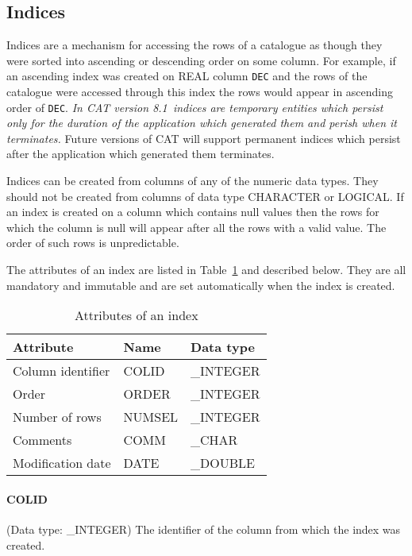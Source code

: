 \documentclass[11pt,twoside]{starlink}
\providecommand{\CATversion}{8.1~}
\begin{document}
\subsection{Indices}

Indices are a mechanism for accessing the rows of a catalogue as though
they were sorted into ascending or descending order on some column.  For
example, if an ascending index was created on REAL column \texttt{DEC} and
the rows of the catalogue were accessed through this index the rows
would appear in ascending order of \texttt{DEC}. \textit{In CAT version
\CATversion indices are temporary entities which persist only for the
duration of the application which generated them and perish when it
terminates.} Future versions of CAT will support permanent indices which
persist after the application which generated them terminates.

Indices can be created from columns of any of the numeric data types.
They should not be created from columns of data type CHARACTER or
LOGICAL. If an index is created on a column which contains null values
then the rows for which the column is null will appear after all the
rows with a valid value. The order of such rows is unpredictable.

The attributes of an index are listed in Table~\ref{INDEX_ATT} and
described below. They are all mandatory and immutable and are set
automatically when the index is created.

\begin{table}[htbp]

\begin{center}
\begin{tabular}{lll}
Attribute         & Name    & Data type  \\ \hline
Column identifier & COLID   & \_INTEGER  \\
Order             & ORDER   & \_INTEGER  \\
Number of rows    & NUMSEL  & \_INTEGER  \\
Comments          & COMM    & \_CHAR     \\
Modification date & DATE    & \_DOUBLE   \\
\end{tabular}
\end{center}

\caption{\label{INDEX_ATT}Attributes of an index}

\end{table}

\paragraph{COLID}
(Data type: \_INTEGER)
The identifier of the column from which the index was created.
\end{document}
